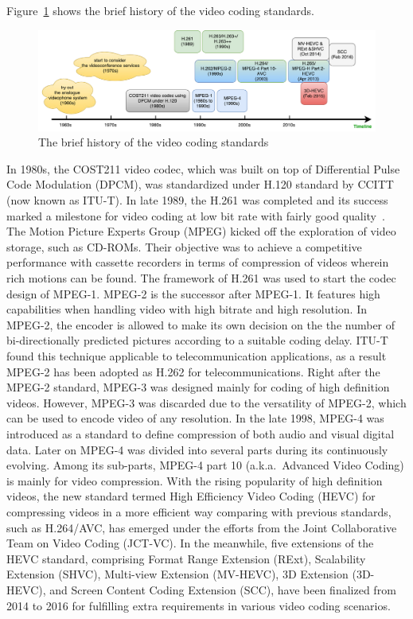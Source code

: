 Figure~\ref{fig:video-std-brief-history} shows the brief history of
the video coding standards.
\begin{figure}
    \centering
    \includegraphics[width=\textwidth,height=\textheight,keepaspectratio]{Figures/video-std-brief-history.pdf}
    \caption[The brief history of the video coding standards]
    {The brief history of the video coding standards}\label{fig:video-std-brief-history}
\end{figure}
In 1980s, the COST211 video codec, which was built on top of Differential
Pulse Code Modulation (DPCM), was standardized under H.120 standard by CCITT
(now known as ITU-T).
In late 1989, the H.261 was completed and its success marked a milestone for
video coding at low bit rate with fairly good quality~\parencite{RN181}.
The Motion Picture Experts Group (MPEG) kicked off the exploration of video
storage, such as CD-ROMs.
Their objective was to achieve a competitive performance with cassette
recorders in terms of compression of videos wherein rich motions can be found.
The framework of H.261 was used to start the codec design of MPEG-1.
MPEG-2 is the successor after MPEG-1.
It features high capabilities when handling video with
high bitrate and high resolution.
In MPEG-2, the encoder is allowed to make its own decision on the
the number of bi-directionally predicted pictures according to a
suitable coding delay.
ITU-T found this technique applicable to telecommunication applications, as
a result MPEG-2 has been adopted as H.262 for telecommunications.
Right after the MPEG-2 standard, MPEG-3 was designed mainly for coding of
high definition videos.
However, MPEG-3 was discarded due to the versatility of MPEG-2, which
can be used to encode video of any resolution.
In the late 1998, MPEG-4 was introduced as a standard to define compression of
both audio and visual digital data.
Later on MPEG-4 was divided into several parts during its continuously evolving.
Among its sub-parts, MPEG-4 part 10 (a.k.a.\ Advanced Video Coding) is mainly
for video compression.
With the rising popularity of high definition videos, the new standard
termed High Efficiency Video Coding (HEVC) for compressing videos in a more
efficient way comparing with previous standards, such as H.264/AVC, has
emerged under the efforts from the Joint Collaborative Team on Video
Coding (JCT-VC).
In the meanwhile, five extensions of the HEVC standard, comprising
Format Range Extension (RExt), Scalability Extension (SHVC),
Multi-view Extension (MV-HEVC), 3D Extension (3D-HEVC),
and Screen Content Coding Extension (SCC), have been finalized
from 2014 to 2016 for fulfilling extra requirements in various video coding
scenarios.

